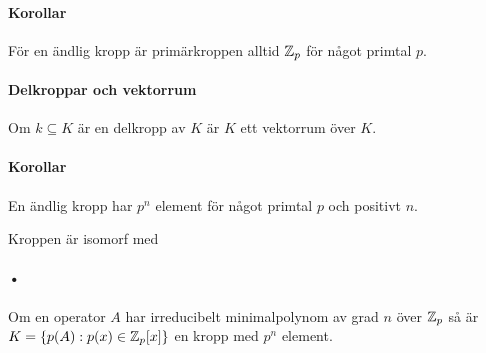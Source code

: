 \paragraph{Korollar}
För en ändlig kropp är primärkroppen alltid $\mathbb{Z}_{p}$ för något primtal $p$.

\proof

\paragraph{Delkroppar och vektorrum}
Om $k\subseteq K$ är en delkropp av $K$ är $K$ ett vektorrum över $K$.

\proof

\paragraph{Korollar}
En ändlig kropp har $p^{n}$ element för något primtal $p$ och positivt $n$.

\proof
Kroppen är isomorf med 

\paragraph{•}
Om en operator $A$ har irreducibelt minimalpolynom av grad $n$ över $\mathbb{Z}_{p}$ så är $K = \{p(A): p(x)\in\mathbb{Z}_{p}[x]\}$ en kropp med $p^{n}$ element.

\proof